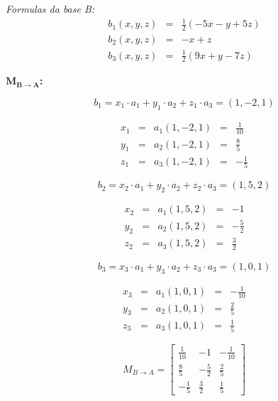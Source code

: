 \documentclass[11pt]{article}
\newenvironment{question}[1]
  {\par\addvspace{\medskipamount}
   \noindent\makebox[0pt][r]{\textbf{#1)} }\ignorespaces}
  {\par\addvspace{\medskipamount}}
\begin{document}
\begin{question}{1}
\bigskip
\textit{Formulas da base B:}
$$
\begin{array}{rcl}
    b_1(x,y,z) &= &\frac{1}{2}(-5x-y+5z)\\
    b_2(x,y,z) &= &-x+z\\
    b_3(x,y,z) &= &\frac{1}{2}(9x+y-7z)
\end{array}
$$

\newpage
\bigskip
\textbf{$\boldsymbol{M_{B \rightarrow A}}$:}

$$b_1 = x_1 \cdot a_1+y_1 \cdot a_2+z_1 \cdot a_3=(1,-2,1)$$

$$
\begin{array}{rcrcl}
    x_1 &= &a_1(1,-2,1) &= &\frac{1}{10}\\
    y_1 &= &a_2(1,-2,1) &= &\frac{8}{5}\\
    z_1 &= &a_3(1,-2,1) &= &-\frac{1}{5}
\end{array}
$$

$$b_2 = x_2 \cdot a_1+y_2 \cdot a_2+z_2 \cdot a_3=(1,5,2)$$

$$
\begin{array}{rcrcl}
    x_2 &= &a_1(1,5,2) &= &-1\\
    y_2 &= &a_2(1,5,2) &= &-\frac{5}{2}\\
    z_2 &= &a_3(1,5,2) &= &\frac{3}{2}
\end{array}
$$

$$b_3 = x_3 \cdot a_1+y_3 \cdot a_2+z_3 \cdot a_3=(1,0,1)$$

$$
\begin{array}{rcrcl}
    x_3 &= &a_1(1,0,1) &= &-\frac{1}{10}\\
    y_3 &= &a_2(1,0,1) &= &\frac{2}{5}\\
    z_3 &= &a_3(1,0,1) &= &\frac{1}{5}
\end{array}
$$

$$
M_{B \rightarrow A}=\left[\begin{array}{rrr}
    \frac{1}{10} &-1 &-\frac{1}{10}\\
    \frac{8}{5} &-\frac{5}{2} &\frac{2}{5}\\
    -\frac{1}{5} &\frac{3}{2} &\frac{1}{5}
\end{array}\right]
$$

\end{question}
\end{document}
